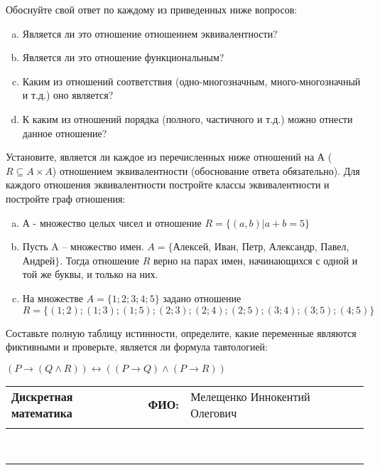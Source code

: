 \documentclass[10pt]{exam}
\newcommand{\class}{Дискретная математика}
\newcommand{\examdate}{}
\begin{document}
\begin{questions}
Обоснуйте свой ответ по каждому из приведенных ниже вопросов:
\begin{enumerate} [a)]\setcounter{enumi}{0}
    \item Является ли это отношение отношением эквивалентности?
    \item Является ли это отношение функциональным?
    \item Каким из отношений соответствия (одно-многозначным, много-многозначный и т.д.) оно является?
    \item К каким из отношений порядка (полного, частичного и т.д.) можно отнести данное отношение?
\end{enumerate}
\question
Установите, является ли каждое из перечисленных ниже отношений на А ($R \subseteq A \times A$) отношением эквивалентности (обоснование ответа обязательно). Для каждого отношения эквивалентности постройте классы 
эквивалентности и постройте граф отношения:
\begin{enumerate} [a)]\setcounter{enumi}{0}
\item А - множество целых чисел и отношение $R = \{(a,b)|a + b = 5\}$
\item Пусть A – множество имен. $A = \{ $Алексей, Иван, Петр, Александр, Павел, Андрей$ \}$. Тогда отношение $R $ верно на парах имен, начинающихся с одной и той же буквы, и только на них.
\item На множестве $A = \{1; 2; 3; 4; 5\}$ задано отношение $R = \{(1; 2); (1; 3); (1; 5); (2; 3); (2; 4); (2; 5); (3; 4); (3; 5); (4; 5)\}$
\end{enumerate}\question Составьте полную таблицу истинности, определите, какие переменные являются фиктивными и проверьте, является ли формула тавтологией:

$(P \rightarrow (Q \land R)) \leftrightarrow ((P \rightarrow Q) \land (P \rightarrow R))$

\end{questions}
\newpage
\begin{flushright}
\begin{tabular}{p{2.8in} r l}
\textbf{\class} & \textbf{ФИО:} &Мелещенко Иннокентий Олегович
\\

\textbf{\examdate} &&\\
\end{tabular}\\
\end{flushright}
\rule[1ex]{\textwidth}{.1pt}
\end{document}
